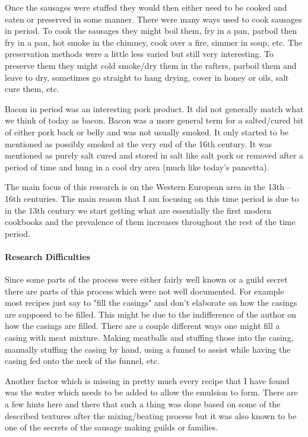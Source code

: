 \documentclass[letterpaper,11pt,leqno]{article}
\begin{document}
Once the sausages were stuffed they would then either need to be cooked and eaten or preserved in some manner. There were many ways used to cook sausages in period. To cook the sausages they might boil them, fry in a pan, parboil then fry in a pan, hot smoke in the chimney, cook over a fire, simmer in soup, etc. The preservation methods were a little less varied but still very interesting. To preserve them they might cold smoke/dry them in the rafters, parboil them and leave to dry, sometimes go straight to hang drying, cover in honey or oils, salt cure them, etc.

Bacon in period was an interesting pork product. It did not generally match what we think of today as bacon. Bacon was a more general term for a salted/cured bit of either pork back or belly and was not usually smoked. It only started to be mentioned as possibly smoked at the very end of the 16th century. It was mentioned as purely salt cured and stored in salt like salt pork or removed after a period of time and hung in a cool dry area (much like today's pancetta).

The main focus of this research is on the Western European area in the 13th -- 16th centuries. The main reason that I am focusing on this time period is due to in the 13th century we start getting what are essentially the first modern cookbooks and the prevalence of them increases throughout the rest of the time period. 

 
\paragraph{Research Difficulties} Since some parts of the process were either fairly well known or a guild secret there are parts of this process which were not well documented. For example most recipes just say to "fill the casings" and don't elaborate on how the casings are supposed to be filled. This might be due to the indifference of the author on how the casings are filled. There are a couple different ways one might fill a casing with meat mixture. Making meatballs and stuffing those into the casing, manually stuffing the casing by hand, using a funnel to assist while having the casing fed onto the neck of the funnel, etc.

Another factor which is missing in pretty much every recipe that I have found was the water which needs to be added to allow the emulsion to form. There are a few hints here and there that such a thing was done based on some of the described textures after the mixing/beating process but it was also known to be one of the secrets of the sausage making guilds or families.
\end{document}
